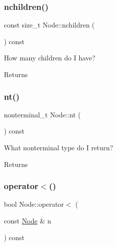 \mbox{\label{class_node_a8a7ea0e9f9bac373dbcdd427cb5ebe48}} 
\subsubsection{\texorpdfstring{nchildren()}{nchildren()}}
{\footnotesize\ttfamily const size\+\_\+t Node\+::nchildren (\begin{DoxyParamCaption}{ }\end{DoxyParamCaption}) const\hspace{0.3cm}{\ttfamily [inline]}}

How many children do I have? \begin{DoxyReturn}{Returns}

\end{DoxyReturn}
\mbox{\label{class_node_a4abe3acdc804489a01ef13a25b130fd8}} 
\subsubsection{\texorpdfstring{nt()}{nt()}}
{\footnotesize\ttfamily nonterminal\+\_\+t Node\+::nt (\begin{DoxyParamCaption}{ }\end{DoxyParamCaption}) const\hspace{0.3cm}{\ttfamily [inline]}}

What nonterminal type do I return? \begin{DoxyReturn}{Returns}

\end{DoxyReturn}
\mbox{\label{class_node_a8b05feb361beb04d465619751a2297b1}} 
\subsubsection{\texorpdfstring{operator$<$()}{operator<()}}
{\footnotesize\ttfamily bool Node\+::operator$<$ (\begin{DoxyParamCaption}\item[{const \hyperlink{class_node}{Node} \&}]{n }\end{DoxyParamCaption}) const\hspace{0.3cm}{\ttfamily [inline]}}

